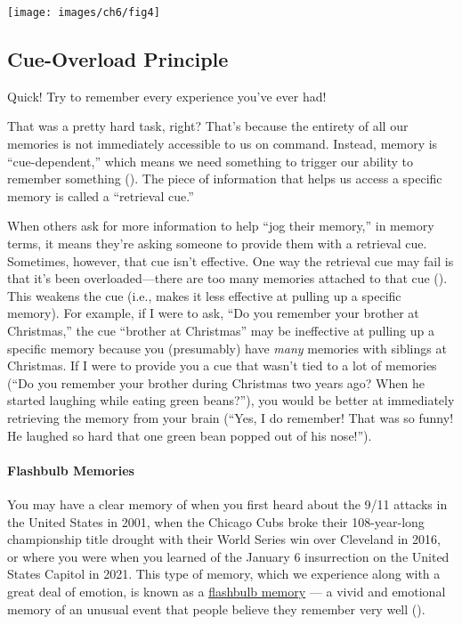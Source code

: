 \documentclass[
]{krantz}
\begin{document}
\begin{center}\texttt{[image: images/ch6/fig4]} \end{center}

\subsection*{Cue-Overload Principle}\label{cue-overload-principle}


Quick! Try to remember every experience you've ever had!

That was a pretty hard task, right? That's because the entirety of all our memories is not immediately accessible to us on command. Instead, memory is ``cue-dependent,'' which means we need something to trigger our ability to remember something (). The piece of information that helps us access a specific memory is called a ``retrieval cue.''

When others ask for more information to help ``jog their memory,'' in memory terms, it means they're asking someone to provide them with a retrieval cue. Sometimes, however, that cue isn't effective. One way the retrieval cue may fail is that it's been overloaded---there are too many memories attached to that cue (). This weakens the cue (i.e., makes it less effective at pulling up a specific memory). For example, if I were to ask, ``Do you remember your brother at Christmas,'' the cue ``brother at Christmas'' may be ineffective at pulling up a specific memory because you (presumably) have \emph{many} memories with siblings at Christmas. If I were to provide you a cue that wasn't tied to a lot of memories (``Do you remember your brother during Christmas two years ago? When he started laughing while eating green beans?''), you would be better at immediately retrieving the memory from your brain (``Yes, I do remember! That was so funny! He laughed so hard that one green bean popped out of his nose!'').

\paragraph*{Flashbulb Memories}\label{flashbulb-memories}

You may have a clear memory of when you first heard about the 9/11 attacks in the United States in 2001, when the Chicago Cubs broke their 108-year-long championship title drought with their World Series win over Cleveland in 2016, or where you were when you learned of the January 6 insurrection on the United States Capitol in 2021. This type of memory, which we experience along with a great deal of emotion, is known as a \hyperref[flashbulb-memory]{flashbulb memory} --- a vivid and emotional memory of an unusual event that people believe they remember very well ().
\end{document}
